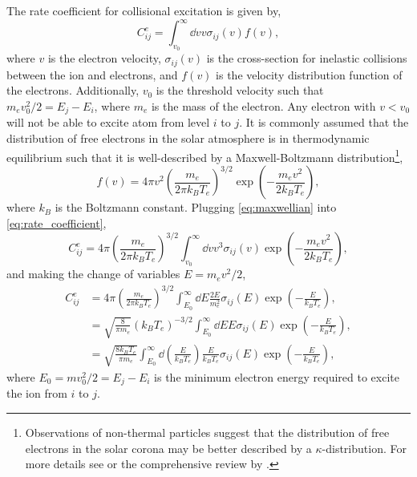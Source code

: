 The rate coefficient for collisional excitation is given by,
\begin{equation}\label{eq:rate_coefficient}
    C^e_{ij} = \int_{v_0}^{\infty}\dd{v}v\sigma_{ij}(v)f(v),
\end{equation}
where $v$ is the electron velocity, $\sigma_{ij}(v)$ is the cross-section for inelastic collisions between the ion and electrons, and $f(v)$ is the velocity distribution function of the electrons. Additionally, $v_0$ is the threshold velocity such that $m_ev_0^2/2 = E_j - E_i$, where $m_e$ is the mass of the electron. Any electron with $v<v_0$ will not be able to excite atom from level $i$ to $j$. It is commonly assumed that the distribution of free electrons in the solar atmosphere is in thermodynamic equilibrium such that it is well-described by a Maxwell-Boltzmann distribution\footnote{Observations of non-thermal particles \citep[e.g][]{dzifcakova_diagnostics_2011} suggest that the distribution of free electrons in the solar corona may be better described by a $\kappa$-distribution. For more details see \citet{cranmer_suprathermal_2014} or the comprehensive review by \citet{dudik_nonequilibrium_2017}.},
\begin{equation}\label{eq:maxwellian}
    f(v) = 4\pi v^2 \left(\frac{m_e}{2\pi k_BT_e}\right)^{3/2}\exp{\left(-\frac{m_ev^2}{2k_BT_e}\right)},
\end{equation}
where $k_B$ is the Boltzmann constant. Plugging \autoref{eq:maxwellian} into \autoref{eq:rate_coefficient},
\begin{equation*}
    C^e_{ij} =  4\pi\left(\frac{m_e}{2\pi k_BT_e}\right)^{3/2}\int_{v_0}^{\infty}\dd{v}v^3\sigma_{ij}(v)\exp{\left(-\frac{m_ev^2}{2k_BT_e}\right)},
\end{equation*}
and making the change of variables $E=m_ev^2/2$,
\begin{align}\label{eq:rate_coefficient_e}
    C^e_{ij} &= 4\pi\left(\frac{m_e}{2\pi k_BT_e}\right)^{3/2}\int_{E_0}^{\infty}\dd{E}\frac{2E}{m_e^2}\sigma_{ij}(E)\exp{\left(-\frac{E}{k_BT_e}\right)},\nonumber\\
    &= \sqrt{\frac{8}{\pi m_e}}(k_BT_e)^{-3/2}\int_{E_0}^{\infty}\dd{E}E\sigma_{ij}(E)\exp{\left(-\frac{E}{k_BT_e}\right)},\nonumber\\
    &= \sqrt{\frac{8k_BT_e}{\pi m_e}}\int_{E_0}^{\infty}\dd{\left(\frac{E}{k_BT_e}\right)}\frac{E}{k_BT_e}\sigma_{ij}(E)\exp{\left(-\frac{E}{k_BT_e}\right)},
\end{align}
where $E_0=mv_0^2/2=E_j-E_i$ is the minimum electron energy required to excite the ion from $i$ to $j$.

